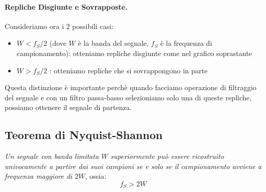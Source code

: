 \paragraph{Repliche Disgiunte e Sovrapposte.}Consideriamo ora i 2 possibili casi:
\begin{itemize}
    \item $W < f_S/2$ (dove $W$ è la banda del segnale, $f_S$ è la frequenza di campionamento): otteniamo repliche disgiunte come nel grafico soprastante
    \item $W > f_S/2$ : otteniamo repliche che si sovrappongono in parte
\end{itemize}
Questa distinzione è importante perchè quando facciamo operazione di filtraggio del segnale e con un filtro passa-basso selezioniamo
solo una di queste repliche, possiamo ottenere il segnale di partenza.\\
\bigskip
{}
\subsection{Teorema di Nyquist-Shannon}
\textit{Un segnale con banda limitata $W$ superiormente può essere ricostruito univocamente a partire dai suoi campioni se e solo se
 il campionamento avviene a frequenza maggiore di $2W$}, ossia:
 \begin{equation}
    f_S > 2W
 \end{equation}

